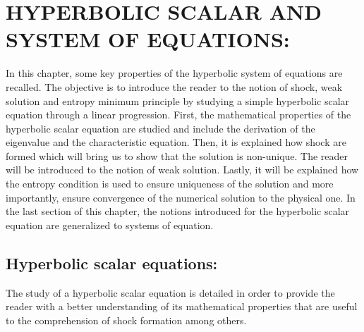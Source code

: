 %
%
%

%
\chapter{\uppercase {Hyperbolic scalar and system of equations:}}
%
In this chapter, some key properties of the hyperbolic system of equations are recalled. The objective is to introduce the reader to the notion of shock, weak solution and entropy minimum principle by studying a simple hyperbolic scalar equation through a linear progression. First, the mathematical properties of the hyperbolic scalar equation are studied and include the derivation of the eigenvalue and the characteristic equation. Then, it is explained how shock are formed which will bring us to show that the solution is non-unique. The reader will be introduced to the notion of weak solution. Lastly, it will be explained how the entropy condition is used to ensure uniqueness of the solution and more importantly, ensure convergence of the numerical solution to the physical one. In the last section of this chapter, the notions introduced for the hyperbolic scalar equation are generalized to systems of equation.
\section{Hyperbolic scalar equations:}
The study of a hyperbolic scalar equation is detailed in order to provide the reader with a better understanding of its mathematical properties that are useful to the comprehension of shock formation among others.
